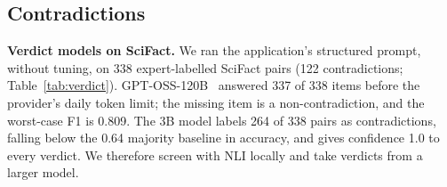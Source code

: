 \documentclass[conference]{IEEEtran}
\begin{document}
\begin{table}[t]
\centering
\caption{Round 2: held-out queries, four arms, one rater (1--5)}
\label{tab:hyp2}
\end{table}

\subsection{Contradictions}
\label{sec:contra}

\textbf{Verdict models on SciFact.} We ran the application's structured prompt, without tuning, on 338 expert-labelled SciFact pairs (122 contradictions; Table~\ref{tab:verdict}). GPT-OSS-120B~\cite{openai2025gptoss} answered 337 of 338 items before the provider's daily token limit; the missing item is a non-contradiction, and the worst-case F1 is 0.809. The 3B model labels 264 of 338 pairs as contradictions, falling below the 0.64 majority baseline in accuracy, and gives confidence 1.0 to every verdict. We therefore screen with NLI locally and take verdicts from a larger model.

\begin{table}[t]
\centering
\caption{Contradiction verdicts on SciFact (338 pairs)}
\label{tab:verdict}
\end{table}
\end{document}
